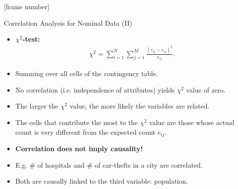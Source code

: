 \documentclass[aspectratio=169,t]{beamer}
\begin{document}
  {
    [frame number]
    \begin{frame}{Correlation Analysis for Nominal Data (II)}
      \begin{itemize}
        \item \textbf{\color{airforceblue}$\chi^2$-test:}
        \begin{align}
          \chi^2 = \sum_{i=1}^{N}\sum_{j=1}^{M} \frac{(c_{ij}-e_{ij})^2}{e_{ij}}.
        \end{align}
        \item Summing over all cells of the contingency table.
        \item No correlation (i.e. independence of attributes) yields $\chi^2$ value of zero.
        \item The larger the $\chi^2$ value, the more likely the variables are related.
        \item The cells that contribute the most to the $\chi^2$ value
are those whose actual count is very different from the expected count $e_{ij}$.
      \end{itemize}
      \begin{itemize}
        \item \textbf{Correlation does not imply causality!}
        \item E.g. $\#$ of hospitals and $\#$ of car-thefts in a city are correlated.
        \item Both are causally linked to the third variable: population.
      \end{itemize}
    \end{frame}
  }
\end{document}
